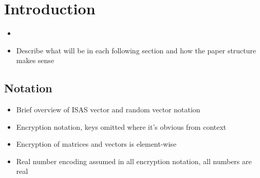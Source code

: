 \documentclass[letterpaper, 10 pt, conference]{ieeeconf}  %
\begin{document}
\section{Introduction}
\begin{itemize}
   \item 
   \item Describe what will be in each following section and how the paper structure makes sense
\end{itemize}
\subsection{Notation}
\begin{itemize}
   \item Brief overview of ISAS vector and random vector notation
   \item Encryption notation, keys omitted where it's obvious from context
   \item Encryption of matrices and vectors is element-wise
   \item Real number encoding assumed in all encryption notation, all numbers are real
\end{itemize}

\end{document}
